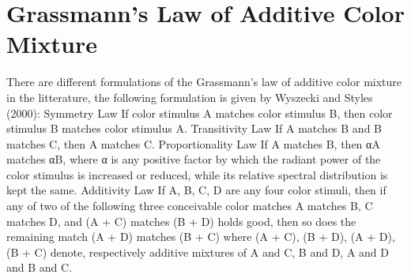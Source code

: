 \section{Grassmann's Law of Additive Color Mixture}
\label{sec:grassmann-laws-of-additive-color-mixture}

There are different formulations of the Grassmann's law of additive color mixture in the litterature, the following formulation is given by Wyszecki and Styles (2000):
Symmetry Law
If color stimulus A matches color stimulus B, then color stimulus B matches color stimulus A.
Transitivity Law
If A matches B and B matches C, then A matches C.
Proportionality Law
If A matches B, then αA matches αB, where α is any positive factor by which the radiant power of the color stimulus is increased or reduced, while its relative spectral distribution is kept the same.
Additivity Law
If A, B, C, D are any four color stimuli, then if any of two of the following three conceivable color matches A matches B, C matches D, and (A + C) matches (B + D) holds good, then so does the remaining match (A + D) matches (B + C) where (A + C), (B + D), (A + D), (B + C) denote, respectively additive mixtures of A and C, B and D, A and D and B and C.
